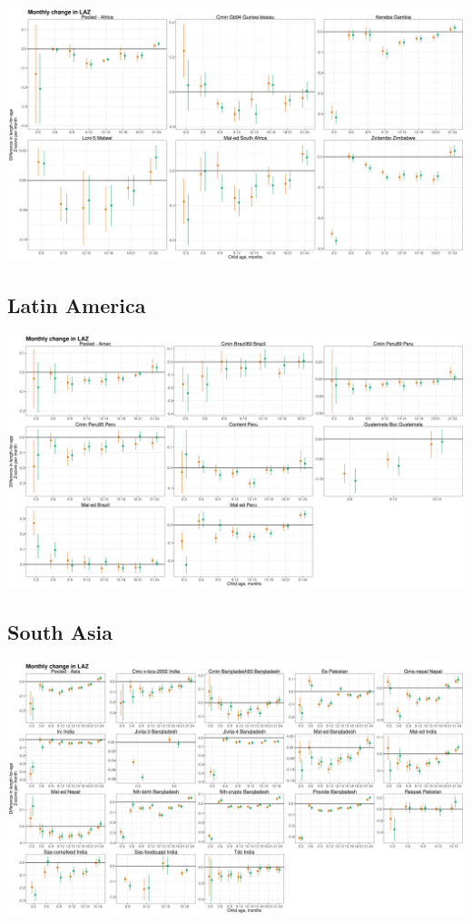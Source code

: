 \documentclass[
  9pt,
]{book}
\begin{document}
\includegraphics[width=75in]{figures//stunting/fig-laz-2-laz_vel-cohort-africa-allage-primary}

\hypertarget{latin-america-4}{%
\subsection{Latin America}\label{latin-america-4}}

\includegraphics[width=75in]{figures//stunting/fig-laz-2-laz_vel-cohort-latamer-allage-primary}

\hypertarget{south-asia-4}{%
\subsection{South Asia}\label{south-asia-4}}

\includegraphics[width=75in]{figures//stunting/fig-laz-2-laz_vel-cohort-asia-allage-primary}
\end{document}

